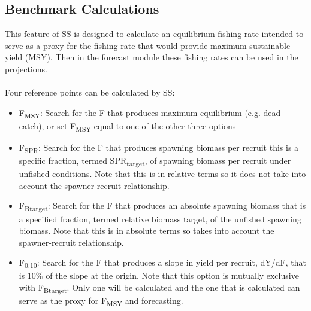 \subsection{Benchmark Calculations}
This feature of SS is designed to calculate an equilibrium fishing rate intended to serve as a proxy for the fishing rate that would provide maximum sustainable yield (MSY).  Then in the forecast module these fishing rates can be used in the projections.
\\\\
Four reference points can be calculated by SS:
\begin{itemize}
	\item F\textsubscript{MSY}: Search for the F that produces maximum equilibrium (e.g. dead catch), or set F\textsubscript{MSY} equal to one of the other three options
	\item F\textsubscript{SPR}: Search for the F that produces spawning biomass per recruit this is a specific fraction, termed SPR\textsubscript{target}, of spawning biomass per recruit under unfished conditions. Note that this is in relative terms so it does not take into account the spawner-recruit relationship.
	\item F\textsubscript{Btarget}: Search for the F that produces an absolute spawning biomass that is a specified fraction, termed relative biomass target, of the unfished spawning biomass. Note that this is in absolute terms so takes into account the spawner-recruit relationship. 
	\item F\textsubscript{0.10}: Search for the F that produces a slope in yield per recruit, dY/dF, that is 10\% of the slope at the origin. Note that this option is mutually exclusive with F\textsubscript{Btarget}. Only one will be calculated and the one that is calculated can serve as the proxy for F\textsubscript{MSY} and forecasting.
\end{itemize}

